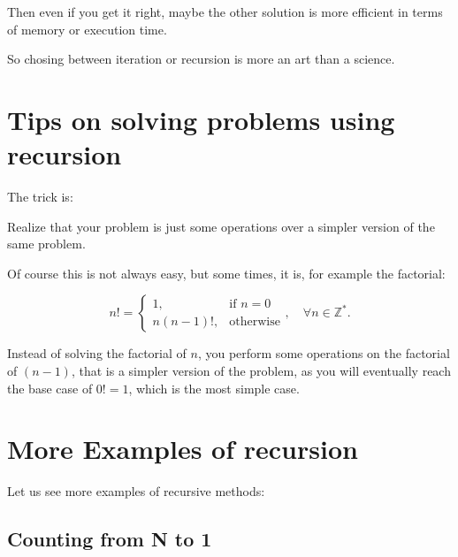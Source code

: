 \documentclass[a4paper, 9pt]{extarticle}
\begin{document}
Then even if you get it right, maybe the other solution is more efficient in
terms of memory or execution time.

So chosing between iteration or recursion is more an art than a science.





\section{Tips on solving problems using recursion}

The trick is:

\begin{blackboard}
Realize that your problem is just some operations over a simpler version of the
same problem.
\end{blackboard}

Of course this is not always easy, but some times, it is, for example the factorial:

\begin{equation*}
  n! =
  \begin{cases}
    1,              & \text{if } n = 0\\
    n(n-1)!,    & \text{otherwise}
  \end{cases}, \quad \forall n \in \mathbb{Z}^{*}.
\end{equation*}

Instead of solving the factorial of $n$, you perform some operations on the
factorial of $(n-1)$, that is a simpler version of the problem, as you will
eventually reach the base case of $0! = 1$, which is the most simple case.




\section{More Examples of recursion}

Let us see more examples of recursive methods:


\subsection{Counting from N to 1}

\begin{multicols}{2}
\columnbreak
\end{multicols}
\end{document}
